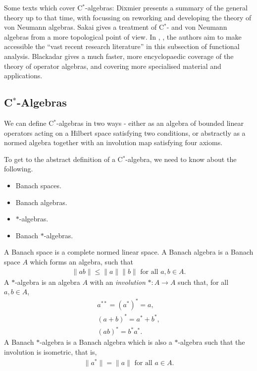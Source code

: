\documentclass[12pt,a4paper]{amsart}
\theoremstyle{plain}
\theoremstyle{definition}
\begin{document}
	Some texts which cover C$^\ast$-algebras: 
	Dixmier \cite{dixmier77} presents a summary of the general theory up to that time, with \cite{dixmier81} focussing on reworking and developing the theory of von Neumann algebras. 
	Sakai \cite{sakai71} gives a treatment of C$^\ast$- and von Neumann algebras from a more topological point of view.
	In \cite{kadison83}, \cite{kadison86}, the authors aim to make accessible the ``vast recent research literature'' in this subsection of functional analysis.
	Blackadar \cite{blackadar06} gives a much faster, more encyclopaedic coverage of the theory of operator algebras, and covering more specialised material and applications.
	

	
\subsection{C$^\ast$-Algebras}
We can define C$^\ast$-algebras in two ways - either as an algebra of bounded linear operators acting on a Hilbert space satisfying two conditions, or abstractly as a normed algebra together with an involution map satisfying four axioms.

\iftrue
	To get to the abstract definition of a C$^\ast$-algebra, we need to know about the following.
\begin{itemize}
	\item Banach spaces.
	\item Banach algebras.
	\item $\ast$-algebras.
	\item Banach $\ast$-algebras.
\end{itemize}

A Banach space is a complete normed linear space. 
A Banach algebra is a Banach space $A$ which forms an algebra, such that 
\begin{align*}
	\|ab\| \leq \|a\| \|b\| \mbox{ for all } a,b \in A.
\end{align*}
A $\ast$-algebra is an algebra $A$ with an \emph{involution} $\ast : A \to A $ such that, for all $a,b \in A$,
\begin{align*}
	 a^{\ast\ast} = (a^\ast)^\ast = a,\\
	(a+b)^\ast = a^\ast + b^\ast,\\	
	(ab)^\ast = b^\ast a^\ast.
\end{align*}
A Banach $\ast$-algebra is a Banach algebra which is also a $\ast$-algebra such that the involution is isometric, that is,
\begin{align*}
	\|a ^\ast \| = \|a\| \mbox{ for all } a \in A.
\end{align*}
\fi
\end{document}
